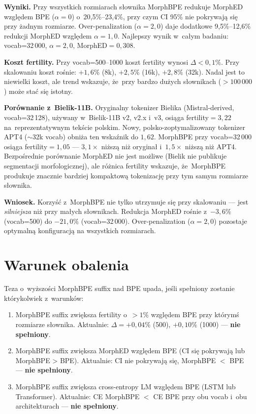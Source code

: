 \textbf{Wyniki.}
Przy wszystkich rozmiarach słownika MorphBPE redukuje MorphED
względem BPE ($\alpha = 0$) o~20{,}5\%--23{,}4\%, przy czym
CI 95\% nie pokrywają się przy żadnym rozmiarze.
Over-penalization ($\alpha = 2{,}0$) daje dodatkowe 9{,}5\%--12{,}6\%
redukcji MorphED względem $\alpha = 1{,}0$.
Najlepszy wynik w~całym badaniu: vocab=32\,000, $\alpha = 2{,}0$,
MorphED$=0{,}308$.

\textbf{Koszt fertility.}
Przy vocab=500--1000 koszt fertility wynosi $\Delta < 0{,}1\%$.
Przy skalowaniu koszt rośnie: $+1{,}6\%$ (8k), $+2{,}5\%$ (16k), $+2{,}8\%$ (32k).
Nadal jest to niewielki koszt, ale trend wskazuje, że~przy bardzo dużych
słownikach ($> 100\,000$) może stać się istotny.

\textbf{Porównanie z~Bielik-11B.}
Oryginalny tokenizer Bielika (Mistral-derived, vocab=32\,128), używany
w~Bielik-11B v2, v2.x i~v3, osiąga fertility$=3{,}22$ na~reprezentatywnym
tekście polskim. Nowy, polsko-zoptymalizowany tokenizer APT4
($\sim$32k vocab) obniża ten wskaźnik do $1{,}62$.
MorphBPE przy vocab=32\,000 osiąga fertility$=1{,}05$ ---
$3{,}1\times$ niższą niż oryginał i~$1{,}5\times$ niższą niż APT4.
Bezpośrednie porównanie MorphED nie jest możliwe (Bielik nie publikuje
segmentacji morfologicznej), ale różnica fertility wskazuje, że~MorphBPE
produkuje znacznie bardziej kompaktową tokenizację przy tym samym
rozmiarze słownika.

\textbf{Wniosek.}
Korzyść z~MorphBPE nie tylko utrzymuje się przy skalowaniu ---
jest \emph{silniejsza} niż przy małych słownikach.
Redukcja MorphED rośnie z~$-3{,}6\%$ (vocab=500) do $-21{,}0\%$ (vocab=32\,000).
Over-penalization ($\alpha = 2{,}0$) pozostaje optymalną konfiguracją
na wszystkich rozmiarach.

\section{Warunek obalenia}

Teza o~wyższości MorphBPE suffix nad BPE upada, jeśli spełniony
zostanie którykolwiek z~warunków:

\begin{enumerate}
  \item MorphBPE suffix zwiększa fertility o~$> 1\%$ względem BPE
        przy którymś rozmiarze słownika.
        Aktualnie: $\Delta = +0{,}04\%$ (500), $+0{,}10\%$ (1000) --- \textbf{nie spełniony}.
  \item MorphBPE suffix zwiększa MorphED względem BPE
        (CI się pokrywają lub MorphBPE > BPE).
        Aktualnie: CI nie pokrywają się, MorphBPE $<$ BPE --- \textbf{nie spełniony}.
  \item MorphBPE suffix zwiększa cross-entropy LM względem BPE
        (LSTM lub Transformer).
        Aktualnie: CE MorphBPE $<$ CE BPE przy obu vocab i~obu architekturach
        --- \textbf{nie spełniony}.
\end{enumerate}

